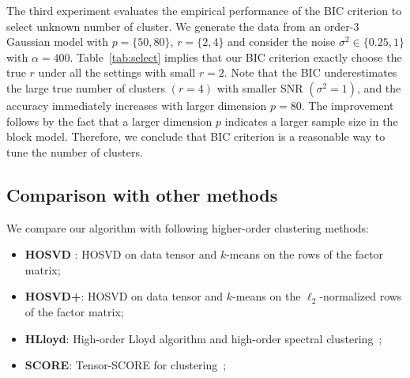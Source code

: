 \documentclass[lettersize,onecolumn,journal]{IEEEtran}
\theoremstyle{definition}
\theoremstyle{definition}
\begin{document}
{The third experiment evaluates the empirical performance of the BIC criterion to select unknown number of cluster. We generate the data from an order-3 Gaussian model with $p = \{50,80\}$, $r = \{2,4\}$ and consider the noise $\sigma^2 \in \{ 0.25,1\}$ with $\alpha = 400$.  Table~\ref{tab:select} implies that our BIC criterion exactly choose the true $r$ under all the settings with small $r = 2$.  Note that the BIC underestimates the large true number of clusters $(r = 4)$ with smaller SNR $(\sigma^2 = 1)$, and the accuracy immediately increases with larger dimension $p = 80$. The improvement follows by the fact that a larger dimension $p$ indicates a larger sample size in the block model. Therefore, we conclude that BIC criterion is a reasonable way to tune the number of clusters.
}

\subsection{Comparison with other methods}\label{subsec:comp}


We compare our algorithm with following higher-order clustering methods:
\begin{itemize}[wide,topsep=-3pt,itemsep=0pt,parsep=1pt]
    \item \textbf{\small HOSVD }: HOSVD on data tensor and $k$-means on the rows of the factor matrix;
    \item \textbf{\small HOSVD+}: HOSVD on data tensor and $k$-means on the $\ell_2$-normalized rows of the factor matrix;
    \item \textbf{\small HLloyd}: High-order Lloyd algorithm and high-order spectral clustering~\citep{han2020exact};
    \item \textbf{\small SCORE}: Tensor-SCORE for clustering~\citep{ke2019community};
\end{itemize}
\end{document}
